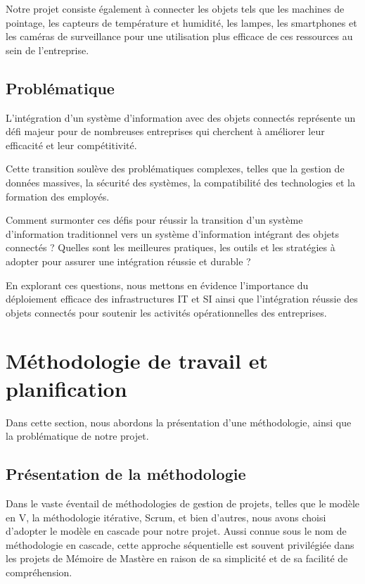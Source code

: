 Notre projet consiste également à connecter les objets tels que les machines de pointage, les capteurs de température et humidité, les lampes, les smartphones et les caméras de surveillance pour une utilisation plus efficace de ces ressources au sein de l'entreprise.

\subsection{Problématique}
L'intégration d'un système d'information avec des objets connectés représente un défi majeur pour de nombreuses entreprises qui cherchent à améliorer leur efficacité et leur compétitivité.

Cette transition soulève des problématiques complexes, telles que la gestion de données massives, la sécurité des systèmes, la compatibilité des technologies et la formation des employés.

Comment surmonter ces défis pour réussir la transition d'un système d'information traditionnel vers un système d'information intégrant des objets connectés ? Quelles sont les meilleures pratiques, les outils et les stratégies à adopter pour assurer une intégration réussie et durable ?

En explorant ces questions, nous mettons en évidence l'importance du déploiement efficace des infrastructures IT et SI ainsi que l'intégration réussie des objets connectés pour soutenir les activités opérationnelles des entreprises.



\section{Méthodologie de travail et planification}

Dans cette section, nous abordons la présentation d'une méthodologie, ainsi que la problématique de notre projet.


\subsection{Présentation de la méthodologie}

Dans le vaste éventail de méthodologies de gestion de projets, telles que le modèle en V, la méthodologie itérative, Scrum, et bien d'autres, nous avons choisi d'adopter le modèle en cascade pour notre projet. Aussi connue sous le nom de méthodologie en cascade, cette approche séquentielle est souvent privilégiée dans les projets de Mémoire de Mastère en raison de sa simplicité et de sa facilité de compréhension.

